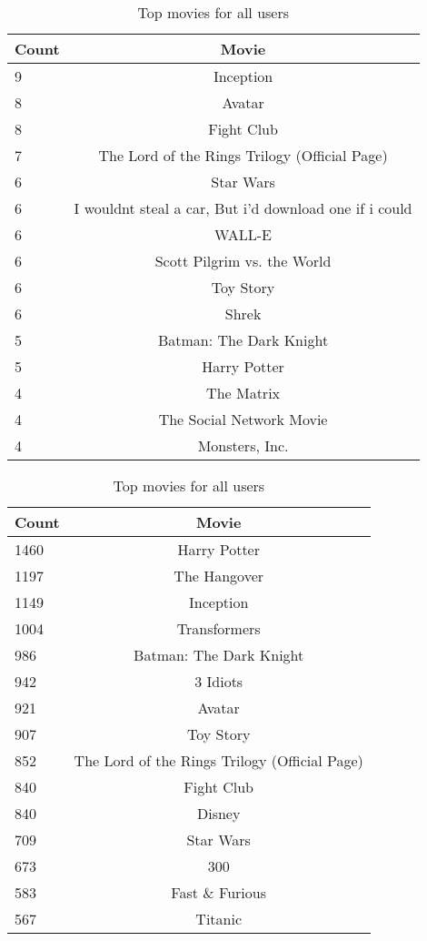 \begin{table}[h]
\begin{minipage}[b]{.50\textwidth}
\centering
  \begin{tabular}{|l|c|} %
  \hline
  		\textbf{Count} & \textbf{Movie} \\ \hline
  		9 & Inception \\ \hline
		8 & Avatar \\ \hline
		8 & Fight Club \\ \hline
		7 & The Lord of the Rings Trilogy (Official Page) \\ \hline
		6 & Star Wars \\ \hline
		6 & I wouldnt steal a car, But i'd download one if i could \\ \hline
		6 & WALL-E \\ \hline
		6 & Scott Pilgrim vs. the World \\ \hline
		6 & Toy Story \\ \hline
		6 & Shrek \\ \hline
		5 & Batman: The Dark Knight \\ \hline
		5 & Harry Potter \\ \hline
		4 & The Matrix \\ \hline
		4 & The Social Network Movie \\ \hline
		4 & Monsters, Inc. \\ \hline
  \end{tabular}
  \caption{Top movies for app users}
\end{minipage}
\begin{minipage}[b]{.50\textwidth}
\centering
  \begin{tabular}{|l|c|} %
  \hline
  		\textbf{Count} & \textbf{Movie} \\ \hline
  		1460 & Harry Potter \\ \hline
		1197 & The Hangover \\ \hline
		1149 & Inception \\ \hline
		1004 & Transformers \\ \hline
		986 & Batman: The Dark Knight \\ \hline
		942 & 3 Idiots \\ \hline
		921 & Avatar \\ \hline
		907 & Toy Story \\ \hline
		852 & The Lord of the Rings Trilogy (Official Page) \\ \hline
		840 & Fight Club \\ \hline
		840 & Disney \\ \hline
		709 & Star Wars \\ \hline
		673 & 300 \\ \hline
		583 & Fast \& Furious \\ \hline
		567 & Titanic \\ \hline
  \end{tabular}
  \caption{Top movies for all users}
\end{minipage}


\end{table}
